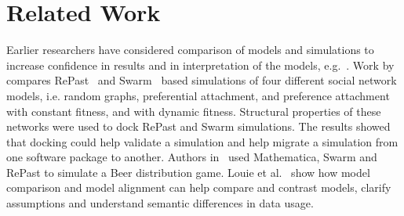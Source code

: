\section{Related Work}
Earlier researchers have considered comparison of models and simulations to increase confidence in results and in interpretation of the models, e.g.~\cite{xu2003docking, axtell96aligning, burton99validation}. Work by~\cite{xu2003docking} compares RePast~\cite{collier2003repast} and Swarm~\cite{minar1996swarm} based simulations of four different social network models, i.e. random graphs, preferential attachment, and preference attachment with constant fitness, and with dynamic fitness. Structural properties of these networks were used to dock RePast and Swarm simulations. The results showed that docking could help validate a simulation and help migrate a simulation from one software package to another. Authors in~\cite{north2002beer} used Mathematica, Swarm and RePast to simulate a Beer distribution game. Louie et al.~\cite{louie2003model} show how model comparison and model alignment can help compare and contrast models, clarify assumptions and understand semantic differences in data usage. 
